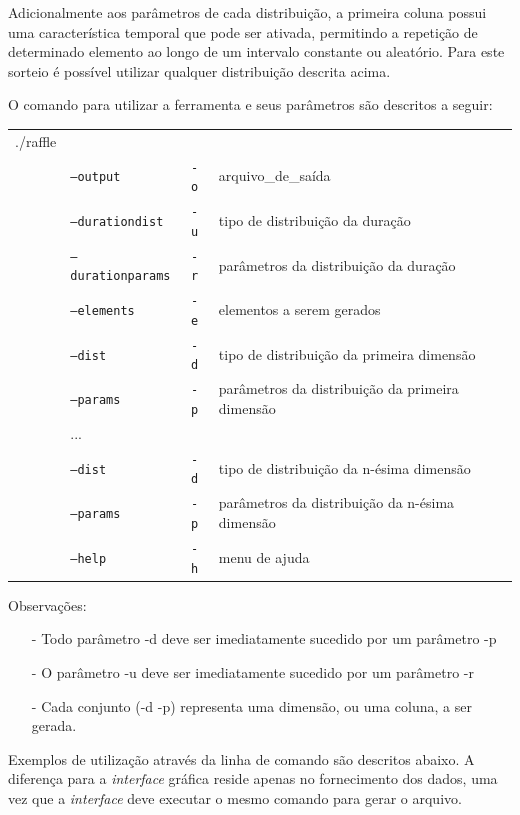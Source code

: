 Adicionalmente aos parâmetros de cada distribuição, a primeira coluna possui uma característica temporal que pode ser ativada, permitindo a repetição de determinado elemento ao longo de um intervalo constante ou aleatório. Para este sorteio é possível utilizar qualquer distribuição descrita acima.

O comando para utilizar a ferramenta e seus parâmetros são descritos a seguir:

\begin{table}[!h]
	\begin{tabular}{llll}
	./raffle & & \\ 
	& \texttt{--output} & \texttt{-o} & arquivo\_de\_saída \\
	& \texttt{--durationdist} & \texttt{-u}  & tipo de distribuição da duração \\
	& \texttt{--durationparams} & \texttt{-r}  & parâmetros da distribuição da duração \\
	& \texttt{--elements} & \texttt{-e}  & elementos a serem gerados \\
	& \texttt{--dist} & \texttt{-d}  & tipo de distribuição da primeira dimensão \\
	& \texttt{--params} & \texttt{-p}  & parâmetros da distribuição da primeira dimensão \\
	& ... & \\
	& \texttt{--dist} & \texttt{-d}  & tipo de distribuição da n-ésima dimensão \\
	& \texttt{--params} & \texttt{-p}  & parâmetros da distribuição da n-ésima dimensão \\
	& \texttt{--help} & \texttt{-h}  & menu de ajuda \\
	\end{tabular}
\end{table}

Observações:
\begin{itemize}
    \item[-] Todo parâmetro -d deve ser imediatamente sucedido por um parâmetro -p
    \item[-] O parâmetro -u deve ser imediatamente sucedido por um parâmetro -r
    \item[-] Cada conjunto (-d -p) representa uma dimensão, ou uma coluna, a ser gerada.
\end{itemize}

Exemplos de utilização através da linha de comando são descritos abaixo. A diferença para a \emph{interface} gráfica reside apenas no fornecimento dos dados, uma vez que a \emph{interface} deve executar o mesmo comando para gerar o arquivo.


